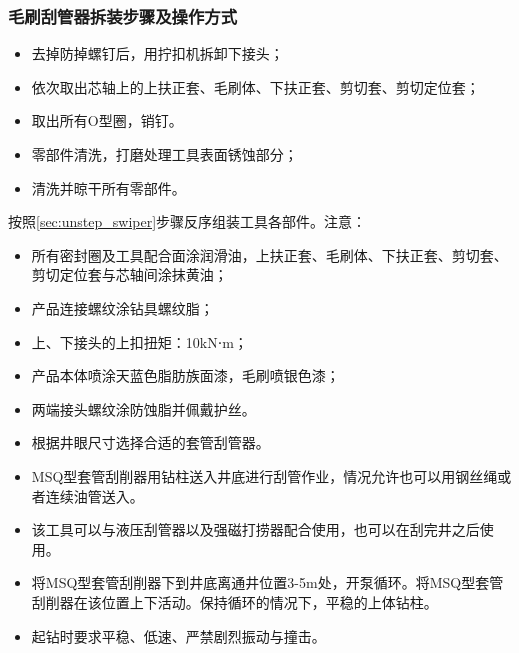 \subsubsection{毛刷刮管器拆装步骤及操作方式}
\label{sec:unstep_swiper}
	\begin{itemize}
	\item 去掉防掉螺钉后，用拧扣机拆卸下接头；
	\item 依次取出芯轴上的上扶正套、毛刷体、下扶正套、剪切套、剪切定位套；
	\item 取出所有O型圈，销钉。
	\item 零部件清洗，打磨处理工具表面锈蚀部分；
	\item 清洗并晾干所有零部件。
	\end{itemize}
按照\ref{sec:unstep_swiper}步骤反序组装工具各部件。注意：
\begin{itemize}
	\item 所有密封圈及工具配合面涂润滑油，上扶正套、毛刷体、下扶正套、剪切套、剪切定位套与芯轴间涂抹黄油；
	\item 产品连接螺纹涂钻具螺纹脂；
	\item 上、下接头的上扣扭矩：10kN⋅m；
	\item 产品本体喷涂天蓝色脂肪族面漆，毛刷喷银色漆；
	\item 两端接头螺纹涂防蚀脂并佩戴护丝。
	\end{itemize}
\begin{itemize}
	\item 	根据井眼尺寸选择合适的套管刮管器。
	\item MSQ型套管刮削器用钻柱送入井底进行刮管作业，情况允许也可以用钢丝绳或者连续油管送入。
\end{itemize}
\begin{itemize}
	\item 	该工具可以与液压刮管器以及强磁打捞器配合使用，也可以在刮完井之后使用。
	\item 	将MSQ型套管刮削器下到井底离通井位置3-5m处，开泵循环。将MSQ型套管刮削器在该位置上下活动。保持循环的情况下，平稳的上体钻柱。
	\item 	起钻时要求平稳、低速、严禁剧烈振动与撞击。
\end{itemize}

